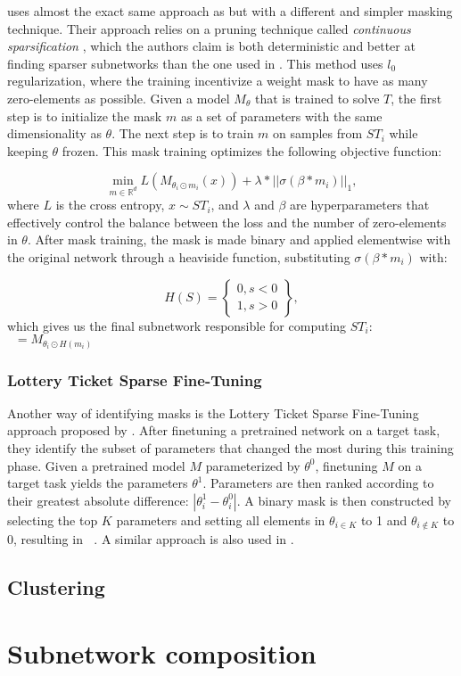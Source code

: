 \documentclass[11pt]{article}
\DeclareMathOperator*{\mini}{min}
\DeclareMathOperator*{\subnetwork}{\hat{\theta_i}}
\begin{document}
\citet{lepori2023break} uses almost the exact same approach as \citet{csordas2020neural} but with a different and simpler masking technique. Their approach relies on a pruning technique called \textit{continuous sparsification} \citep{savarese2020winning}, which the authors claim is both deterministic and better at finding sparser subnetworks than the one used in \citet{csordas2020neural}. This method uses $l_0$ regularization, where the training incentivize a weight mask to have as many zero-elements as possible. Given a model $M_\theta$ that is trained to solve $T$, the first step is to initialize the mask $m$ as a set of parameters with the same dimensionality as $\theta$. The next step is to train $m$ on samples from $ST_i$ while keeping $\theta$ frozen. This mask training optimizes the following objective function: 

\begin{equation}
\mini_{m \in \mathbb{R}^d} L (M_{\theta_i \odot m_i}(x)) + \lambda * ||\sigma(\beta * m_i)||_1,
\end{equation}
where $L$ is the cross entropy, $x \sim ST_i$, and $\lambda$ and $\beta$ are hyperparameters that effectively control the balance between the loss and the number of zero-elements in $\theta$. After mask training, the mask is made binary and applied elementwise with the original network through a heaviside function, substituting $\sigma(\beta * m_i)$ with:

\begin{equation}
    H(S)=
    \left\{
    \begin{array}{lr}
      0,  s < 0 \\
      1,  s > 0
    \end{array}
    \right\},
\end{equation}
which gives us the final subnetwork responsible for computing $ST_i$: $\subnetwork = M_{\theta_i \odot H(m_i)}$

\subsubsection{Lottery Ticket Sparse Fine-Tuning}
Another way of identifying masks is the Lottery Ticket Sparse Fine-Tuning approach proposed by \citet{ansell-etal-2022-composable}. After finetuning a pretrained network on a target task, they identify the subset of parameters that changed the most during this training phase. Given a pretrained model $M$ parameterized by $\theta^0$, finetuning $M$ on a target task yields the parameters $\theta^1$. Parameters are then ranked according to their greatest absolute difference: $|\theta^1_i - \theta^0_i|$. A binary mask is then constructed by selecting the top $K$ parameters and setting all elements in $\theta_{i \in K}$ to 1 and $\theta_{i \notin K}$ to 0, resulting in $\subnetwork$. A similar approach is also used in \citet{frankle2018the}.

\subsection{Clustering}
\citet{watanabe2019interpreting, casper2022graphical}

\section{Subnetwork composition}

\newpage

\end{document}
